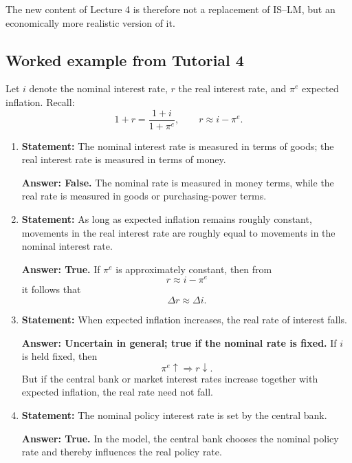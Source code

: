 \noindent
The new content of Lecture 4 is therefore not a replacement of IS--LM, but an economically more realistic version of it.

\subsection{Worked example from Tutorial 4}

\begin{examplebox}[title={Worked Example (Tutorial 4, Question 4): True/false using the Fisher relation}]
Let $i$ denote the nominal interest rate, $r$ the real interest rate, and $\pi^e$ expected inflation. Recall:
\[
1+r=\frac{1+i}{1+\pi^e},
\qquad
r\approx i-\pi^e.
\]

\begin{enumerate}[label=(\alph*)]
    \item \textbf{Statement:} The nominal interest rate is measured in terms of goods; the real interest rate is measured in terms of money.

    \textbf{Answer: False.}  
    The nominal rate is measured in money terms, while the real rate is measured in goods or purchasing-power terms.

    \item \textbf{Statement:} As long as expected inflation remains roughly constant, movements in the real interest rate are roughly equal to movements in the nominal interest rate.

    \textbf{Answer: True.}  
    If $\pi^e$ is approximately constant, then from
    \[
    r\approx i-\pi^e
    \]
    it follows that
    \[
    \Delta r \approx \Delta i.
    \]

    \item \textbf{Statement:} When expected inflation increases, the real rate of interest falls.

    \textbf{Answer: Uncertain in general; true if the nominal rate is fixed.}  
    If $i$ is held fixed, then
    \[
    \pi^e\uparrow \Rightarrow r\downarrow.
    \]
    But if the central bank or market interest rates increase together with expected inflation, the real rate need not fall.

    \item \textbf{Statement:} The nominal policy interest rate is set by the central bank.

    \textbf{Answer: True.}  
    In the model, the central bank chooses the nominal policy rate and thereby influences the real policy rate.
\end{enumerate}
\end{examplebox}

